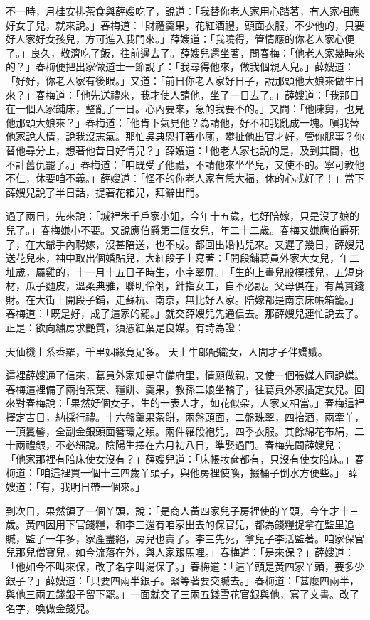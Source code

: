 不一時，月桂安排茶食與薛嫂吃了，說道：「我替你老人家用心踏著，有人家相應好女子兒，就來說。」春梅道：「財禮羹果，花紅酒禮，頭面衣服，不少他的，只要好人家好女孩兒，方可進入我門來。」薛嫂道：「我曉得，管情應的你老人家心便了。」良久，敬濟吃了飯，往前邊去了。薛嫂兒還坐著，問春梅：「他老人家幾時來的？」春梅便把出家做道士一節說了：「我尋得他來，做我個親人兒。」薛嫂道：「好好，你老人家有後眼。」又道：「前日你老人家好日子，說那頭他大娘來做生日來？」春梅道：「他先送禮來，我才使人請他，坐了一日去了。」薛嫂道：「我那日在一個人家鋪床，整亂了一日。心內要來，急的我要不的。」又問：「他陳舅，也見他那頭大娘來？」春梅道：「他肯下氣見他？為請他，好不和我亂成一塊。嗔我替他家說人情，說我沒志氣。那怕吳典恩打著小廝，攀扯他出官才好，管你腿事？你替他尋分上，想著他昔日好情兒？」薛嫂道：「他老人家也說的是，及到其間，也不計舊仇罷了。」春梅道：「咱既受了他禮，不請他來坐坐兒，又使不的。寧可教他不仁，休要咱不義。」薛嫂道：「怪不的你老人家有恁大福，休的心忒好了！」當下薛嫂兒說了半日話，提著花箱兒，拜辭出門。

過了兩日，先來說：「城裡朱千戶家小姐，今年十五歲，也好陪嫁，只是沒了娘的兒了。」春梅嫌小不要。又說應伯爵第二個女兒，年二十二歲。春梅又嫌應伯爵死了，在大爺手內聘嫁，沒甚陪送，也不成。都回出婚帖兒來。又遲了幾日，薛嫂兒送花兒來，袖中取出個婚貼兒，大紅段子上寫著：「開段鋪葛員外家大女兒，年二址歲，屬雞的，十一月十五日子時生，小字翠屏。」「生的上畫兒般模樣兒，五短身材，瓜子麵皮，溫柔典雅，聯明伶俐，針指女工，自不必說。父母俱在，有萬貫錢財。在大街上開段子鋪，走蘇杭、南京，無比好人家。陪嫁都是南京床帳箱籠。」春梅道：「既是好，成了這家的罷。」就交薛嫂兒先通信去。那薛嫂兒連忙說去了。正是：欲向繡房求艷質，須憑紅葉是良媒。有詩為證：

天仙機上系香羅，千里姻緣竟足多。
天上牛郎配織女，人間才子伴嬌娥。

這裡薛嫂通了信來，葛員外家知是守備府里，情願做親，又使一個張媒人同說媒。春梅這裡備了兩抬茶葉、糧餅、羹果，教孫二娘坐轎子，往葛員外家插定女兒。回來對春梅說：「果然好個女子，生的一表人才，如花似朵，人家又相當。」春梅這裡擇定吉日，納採行禮。十六盤羹果茶餅，兩盤頭面，二盤珠翠，四抬酒，兩牽羊，一頂鬒髻，全副金銀頭面簪環之類。兩件羅段袍兒，四季衣服。其餘綿花布絹，二十兩禮銀，不必細說。陰陽生擇在六月初八日，準娶過門。春梅先問薛嫂兒： 「他家那裡有陪床使女沒有？」薛嫂兒道：「床帳妝奩都有，只沒有使女陪床。」春梅道：「咱這裡買一個十三四歲丫頭子，與他房裡使喚，掇桶子倒水方便些。」 薛嫂道：「有，我明日帶一個來。」

到次日，果然領了一個丫頭，說：「是商人黃四家兒子房裡使的丫頭，今年才十三歲。黃四因用下官錢糧，和李三還有咱家出去的保官兒，都為錢糧捉拿在監里追贓，監了一年多，家產盡絕，房兒也賣了。李三先死，拿兒子李活監著。咱家保官兒那兒僧寶兒，如今流落在外，與人家跟馬哩。」春梅道：「是來保？」薛嫂道： 「他如今不叫來保，改了名字叫湯保了。」春梅道：「這丫頭是黃四家丫頭，要多少銀子？」薛嫂道：「只要四兩半銀子。緊等著要交贓去。」春梅道：「甚麼四兩半，與他三兩五錢銀子留下罷。」一面就交了三兩五錢雪花官銀與他，寫了文書。改了名字，喚做金錢兒。

